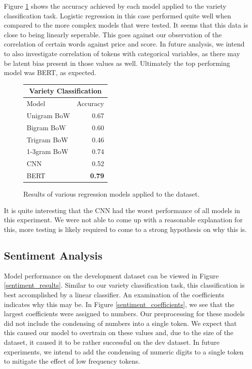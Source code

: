 \documentclass[12pt]{IEEEtran}
\begin{document}
    Figure \ref{classification_results} shows the accuracy achieved by each model applied to the variety classification task. Logistic regression in this case performed quite well when compared to the more complex models that were tested. It seems that this data is close to being linearly seperable. This goes against our observation of the correlation of certain words against price and score. In future analysis, we intend to also investigate correlation of tokens with categorical variables, as there may be latent bias present in those values as well. Ultimately the top performing model was BERT, as expected. \par
\begin{figure}[H]
    \centering
    \begin{tabular}{ |l|r|  }
        \hline
        \multicolumn{2}{|c|}{Variety Classification} \\
        \hline
        Model & Accuracy \\
        \hline
        Unigram BoW   & 0.67 \\
        Bigram BoW   & 0.60 \\
        Trigram BoW  & 0.46 \\
        1-3gram BoW   & 0.74 \\
        \hline
        CNN                    & 0.52 \\
        \hline
        BERT                   & \textbf{0.79} \\
        \hline
    \end{tabular}
    \caption{ Results of various regression models applied to the dataset. }
    \label{classification_results}
\end{figure}
    It is quite interesting that the CNN had the worst performance of all models in this experiment. We were not able to come up with a reasonable explanation for this, more testing is likely required to come to a strong hypothesis on why this is.\par



\subsection{Sentiment Analysis}
Model performance on the development dataset can be viewed in Figure \ref{sentiment_results}. Similar to our variety classification task, this classification is best accomplished by a linear classifier. An examination of the coefficients indicates why this may be. In Figure \ref{sentiment_coefficients}, we see that the largest coefficients were assigned to numbers. Our preprocessing for these models did not include the condensing of numbers into a single token. We expect that this caused our model to overtrain on these values and, due to the size of the dataset, it caused it to be rather successful on the dev dataset. In future experiments, we intend to add the condensing of numeric digits to a single token to mitigate the effect of low frequency tokens.
\end{document}
